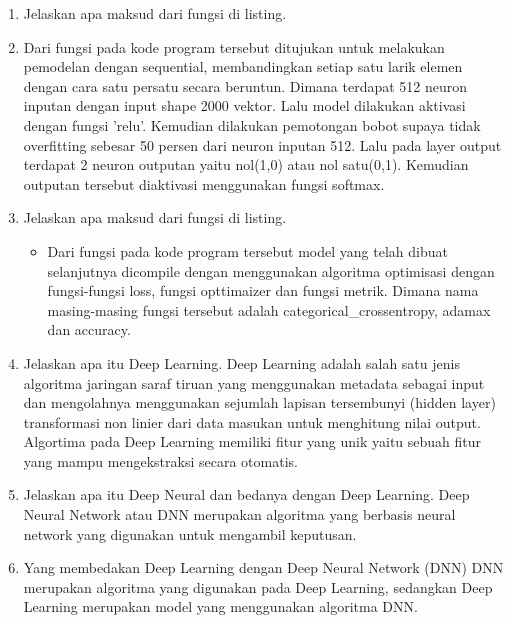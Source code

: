 \begin{enumerate}
\item Jelaskan apa maksud dari fungsi di listing.
 
\item Dari fungsi pada kode program tersebut ditujukan untuk melakukan pemodelan dengan sequential, membandingkan setiap satu larik elemen dengan cara satu persatu secara beruntun. Dimana terdapat 512 neuron inputan dengan input shape 2000 vektor. Lalu model dilakukan aktivasi dengan fungsi 'relu'. Kemudian dilakukan pemotongan bobot supaya tidak overfitting sebesar 50 persen dari neuron inputan 512. Lalu pada layer output terdapat 2 neuron outputan yaitu nol(1,0) atau nol satu(0,1). Kemudian outputan tersebut diaktivasi menggunakan fungsi softmax.
\par 


\item Jelaskan apa maksud dari fungsi di listing.

\begin{itemize}
\item  Dari fungsi pada kode program tersebut model yang telah dibuat selanjutnya dicompile dengan menggunakan algoritma optimisasi dengan fungsi-fungsi loss, fungsi opttimaizer dan fungsi metrik. Dimana nama masing-masing fungsi tersebut adalah categorical\_crossentropy, adamax dan accuracy.
\par 
\end{itemize}
\par
\par

\item Jelaskan apa itu Deep Learning.
\subitem Deep Learning adalah salah satu jenis algoritma jaringan saraf tiruan yang menggunakan metadata sebagai input dan mengolahnya menggunakan sejumlah lapisan tersembunyi (hidden layer) transformasi non linier dari data masukan untuk menghitung nilai output. Algortima pada Deep Learning memiliki fitur yang unik yaitu sebuah fitur yang mampu mengekstraksi secara otomatis.

\item Jelaskan apa itu Deep Neural dan bedanya dengan Deep Learning.
\subitem Deep Neural Network atau DNN merupakan algoritma yang berbasis neural network yang digunakan untuk mengambil keputusan.

\item Yang membedakan Deep Learning dengan  Deep Neural Network (DNN) 
\subitem DNN merupakan algoritma yang digunakan pada Deep Learning, sedangkan Deep Learning merupakan model yang menggunakan algoritma DNN.



\end{enumerate}
